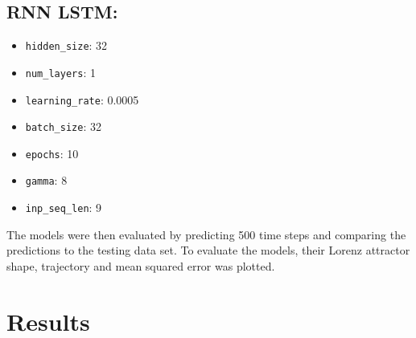 \documentclass[11pt]{article}
\begin{document}
\begin{multicols}{3}
    \subsection*{RNN LSTM:}
    \begin{itemize}
        \item \texttt{hidden\_size}: 32
        \item \texttt{num\_layers}: 1
        \item \texttt{learning\_rate}: 0.0005
        \item \texttt{batch\_size}: 32
        \item \texttt{epochs}: 10
        \item \texttt{gamma}: 8
        \item \texttt{inp\_seq\_len}: 9
    \end{itemize}
\end{multicols}

The models were then evaluated by predicting 500 time steps and comparing the predictions to the testing data set. To evaluate the models, their Lorenz attractor shape, trajectory and mean squared error was plotted.

\section{Results}
\end{document}
